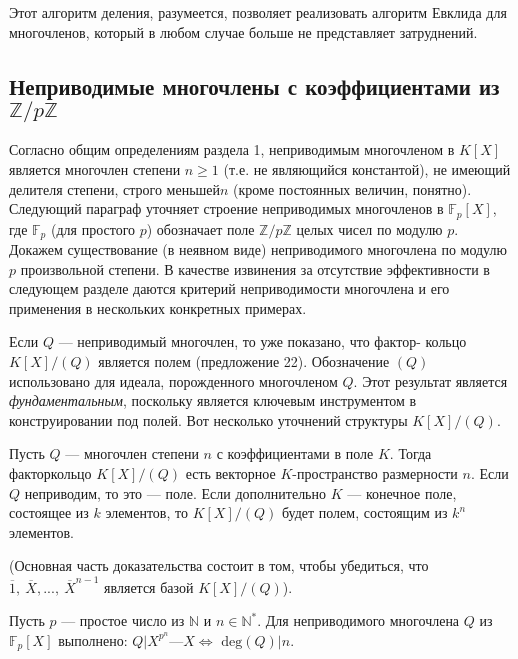 Этот алгоритм деления, разумеется, позволяет реализовать  
алгоритм Евклида для многочленов, который в любом случае больше не 
представляет затруднений. 
\subsection{Неприводимые многочлены с коэффициентами из $\mathbb{Z}\slash p\mathbb{Z}$} 
Согласно общим определениям раздела 1, неприводимым многочленом 
в $K[X]$ является многочлен степени $n\geq 1$ (т.е. не являющийся  
константой), не имеющий делителя степени, строго меньшей$n$ (кроме  
постоянных величин, понятно). Следующий параграф уточняет строение 
неприводимых многочленов в $\mathbb{F}_p[X]$, где $\mathbb{F}_p$ (для простого $p$) обозначает 
поле $\mathbb{Z}\slash p\mathbb{Z}$ целых чисел по модулю $p$. Докажем существование (в неявном 
виде) неприводимого многочлена по модулю $p$ произвольной степени. 
В качестве извинения за отсутствие эффективности в следующем  
разделе даются критерий неприводимости многочлена и его применения в 
нескольких конкретных примерах. 

Если $Q$ — неприводимый многочлен, то уже показано, что фактор- 
кольцо $K[X]\slash(Q)$ является полем (предложение 22). Обозначение $(Q)$  
использовано для идеала, порожденного многочленом $Q$. Этот результат 
является \textit{фундаментальным}, поскольку является ключевым  
инструментом в конструировании под полей. Вот несколько уточнений структуры 
$K[X]\slash(Q)$. 

\begin{predl}
\hspace*{15pt}Пусть $Q$ — многочлен степени $n$ с коэффициентами в поле $K$. Тогда 
факторкольцо $K[X]\slash(Q)$ есть векторное $K$-пространство размерности 
$n$. Если $Q$ неприводим, то это — поле. Если дополнительно $K$ —  
конечное поле, состоящее из $k$ элементов, то $K[X]\slash(Q)$ будет полем,  
состоящим из $k^n$ элементов.
\end{predl}

(Основная часть доказательства состоит в том, чтобы убедиться, 
что $\overline{1},\: \overline{X},...,\: \overline{X}^{n-1}\text{ является базой }K[X]\slash(Q)$).

\begin{thm}
\hspace*{15pt}Пусть $p$ — простое число из $\mathbb{N}$ и $ n \in \mathbb{N}^*$. Для неприводимого 
многочлена $Q$ из $\mathbb{F}_p[X]$ выполнено: $Q | X^{p^n} — X \Leftrightarrow$ $\text{deg}(Q) | n$.
\end{thm} 
\newpage

